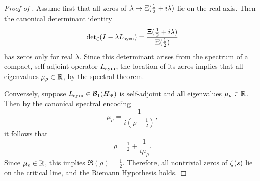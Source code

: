 \begin{proof}[Proof of ]
Assume first that all zeros of \( \lambda \mapsto \Xi(\tfrac{1}{2} + i\lambda) \) lie on the real axis. Then the canonical determinant identity
\[
\det\nolimits_\zeta(I - \lambda L_{\mathrm{sym}}) = \frac{\Xi(\tfrac{1}{2} + i\lambda)}{\Xi(\tfrac{1}{2})}
\]
has zeros only for real \( \lambda \). Since this determinant arises from the spectrum of a compact, self-adjoint operator \( L_{\mathrm{sym}} \), the location of its zeros implies that all eigenvalues \( \mu_\rho \in \mathbb{R} \), by the spectral theorem.

Conversely, suppose \( L_{\mathrm{sym}} \in \mathcal{B}_1(H_{\Psi}) \) is self-adjoint and all eigenvalues \( \mu_\rho \in \mathbb{R} \). Then by the canonical spectral encoding
\[
\mu_\rho = \frac{1}{i(\rho - \tfrac{1}{2})},
\]
it follows that
\[
\rho = \tfrac{1}{2} + \frac{1}{i\mu_\rho}.
\]
Since \( \mu_\rho \in \mathbb{R} \), this implies \( \Re(\rho) = \tfrac{1}{2} \). Therefore, all nontrivial zeros of \( \zeta(s) \) lie on the critical line, and the Riemann Hypothesis holds.
\end{proof}
